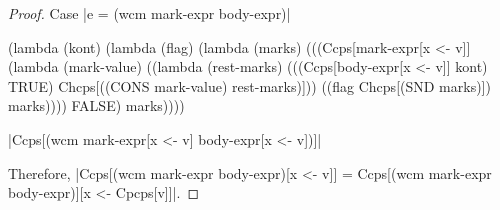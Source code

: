 \begin{proof}{Case \scheme|e = (wcm mark-expr body-expr)|}
\begin{schemeblock}
\begin{schemedisplay}
(lambda (kont)
  (lambda (flag)
    (lambda (marks)
      (((Ccps[mark-expr[x <- v]]
          (lambda (mark-value) 
            ((lambda (rest-marks) 
               (((Ccps[body-expr[x <- v]] kont) TRUE) Chcps[((CONS mark-value) rest-marks)]))
             ((flag Chcps[(SND marks)]) marks))))
        FALSE) marks))))
\end{schemedisplay}
\end{schemeblock}

\noindent
\scheme|Ccps[(wcm mark-expr[x <- v] body-expr[x <- v])]|

\noindent
Therefore, \scheme|Ccps[(wcm mark-expr body-expr)[x <- v]] = Ccps[(wcm mark-expr body-expr)][x <- Cpcps[v]]|.
\end{proof}

